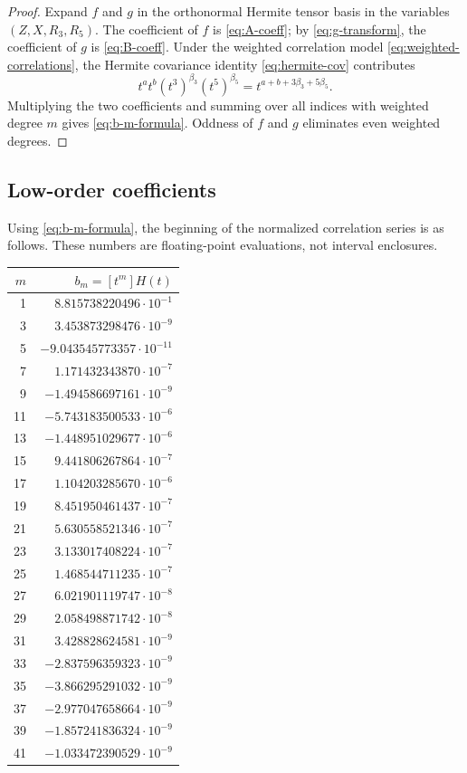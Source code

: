 \documentclass[11pt]{article}
\newcommand{\1}{\mathbf{1}}
\begin{document}
\begin{proof}
Expand \(f\) and \(g\) in the orthonormal Hermite tensor basis in the variables \((Z,X,R_3,R_5)\).  The coefficient of \(f\) is \eqref{eq:A-coeff}; by \eqref{eq:g-transform}, the coefficient of \(g\) is \eqref{eq:B-coeff}.  Under the weighted correlation model \eqref{eq:weighted-correlations}, the Hermite covariance identity \eqref{eq:hermite-cov} contributes
\[
        t^a t^b (t^3)^{\beta_3}(t^5)^{\beta_5}
        =t^{a+b+3\beta_3+5\beta_5}.
\]
Multiplying the two coefficients and summing over all indices with weighted degree \(m\) gives \eqref{eq:b-m-formula}.  Oddness of \(f\) and \(g\) eliminates even weighted degrees.
\end{proof}

\subsection{Low-order coefficients}

Using \eqref{eq:b-m-formula}, the beginning of the normalized correlation series is as follows.  These numbers are floating-point evaluations, not interval enclosures.

\begin{center}
\begin{tabular}{r r}
\toprule
\(m\) & \(b_m=[t^m]H(t)\) \\
\midrule
1  & \(\phantom{-}8.815738220496\cdot10^{-1}\) \\
3  & \(\phantom{-}3.453873298476\cdot10^{-9}\) \\
5  & \(-9.043545773357\cdot10^{-11}\) \\
7  & \(\phantom{-}1.171432343870\cdot10^{-7}\) \\
9  & \(-1.494586697161\cdot10^{-9}\) \\
11 & \(-5.743183500533\cdot10^{-6}\) \\
13 & \(-1.448951029677\cdot10^{-6}\) \\
15 & \(\phantom{-}9.441806267864\cdot10^{-7}\) \\
17 & \(\phantom{-}1.104203285670\cdot10^{-6}\) \\
19 & \(\phantom{-}8.451950461437\cdot10^{-7}\) \\
21 & \(\phantom{-}5.630558521346\cdot10^{-7}\) \\
23 & \(\phantom{-}3.133017408224\cdot10^{-7}\) \\
25 & \(\phantom{-}1.468544711235\cdot10^{-7}\) \\
27 & \(\phantom{-}6.021901119747\cdot10^{-8}\) \\
29 & \(\phantom{-}2.058498871742\cdot10^{-8}\) \\
31 & \(\phantom{-}3.428828624581\cdot10^{-9}\) \\
33 & \(-2.837596359323\cdot10^{-9}\) \\
35 & \(-3.866295291032\cdot10^{-9}\) \\
37 & \(-2.977047658664\cdot10^{-9}\) \\
39 & \(-1.857241836324\cdot10^{-9}\) \\
41 & \(-1.033472390529\cdot10^{-9}\) \\
\bottomrule
\end{tabular}
\end{center}
\end{document}
